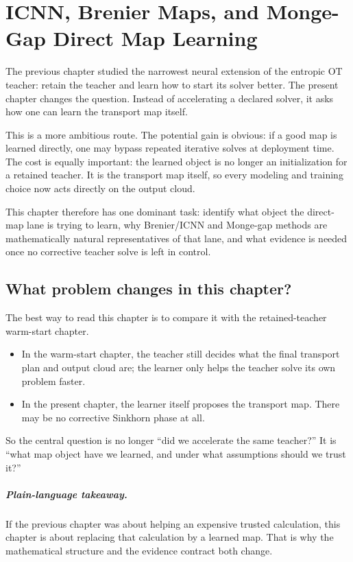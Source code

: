 \chapter{ICNN, Brenier Maps, and Monge-Gap Direct Map Learning}
\label{ch:bf-neural-ot-direct-map}

The previous chapter studied the narrowest neural extension of the entropic OT
teacher: retain the teacher and learn how to start its solver better.  The
present chapter changes the question.  Instead of accelerating a declared
solver, it asks how one can learn the transport map itself.

This is a more ambitious route.  The potential gain is obvious: if a good map is
learned directly, one may bypass repeated iterative solves at deployment time.
The cost is equally important: the learned object is no longer an initialization
for a retained teacher.  It is the transport map itself, so every modeling and
training choice now acts directly on the output cloud.

This chapter therefore has one dominant task: identify what object the direct-map
lane is trying to learn, why Brenier/ICNN and Monge-gap methods are mathematically
natural representatives of that lane, and what evidence is needed once no
corrective teacher solve is left in control.

\section{What problem changes in this chapter?}
\label{sec:bf-neural-ot-direct-orientation}

The best way to read this chapter is to compare it with the retained-teacher
warm-start chapter.
\begin{itemize}
  \item In the warm-start chapter, the teacher still decides what the final
  transport plan and output cloud are; the learner only helps the teacher solve
  its own problem faster.
  \item In the present chapter, the learner itself proposes the transport map.
  There may be no corrective Sinkhorn phase at all.
\end{itemize}
So the central question is no longer ``did we accelerate the same teacher?''  It
is ``what map object have we learned, and under what assumptions should we trust
it?''

\paragraph{Plain-language takeaway.}
If the previous chapter was about helping an expensive trusted calculation, this
chapter is about replacing that calculation by a learned map.  That is why the
mathematical structure and the evidence contract both change.

